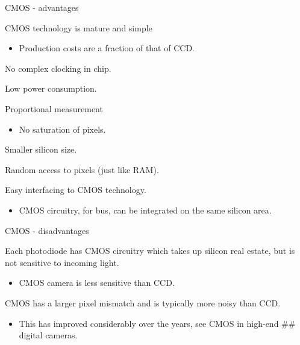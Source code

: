\documentclass[compress]{beamer}
\begin{document}
\begin{frame}{CMOS - advantages}

CMOS technology is mature and simple

\begin{itemize}

\item
  Production costs are a fraction of that of CCD.
\end{itemize}

No complex clocking in chip.

Low power consumption.

Proportional measurement

\begin{itemize}

\item
  No saturation of pixels.
\end{itemize}

Smaller silicon size.

Random access to pixels (just like RAM).

Easy interfacing to CMOS technology.

\begin{itemize}

\item
  CMOS circuitry, \eg for bus, can be integrated on the same silicon
  area.
\end{itemize}

\end{frame}

\begin{frame}{CMOS - disadvantages}

Each photodiode has CMOS circuitry which takes up silicon real estate,
but is not sensitive to incoming light.

\begin{itemize}

\item
  CMOS camera is less sensitive than CCD.
\end{itemize}

CMOS has a larger pixel mismatch and is typically more noisy than CCD.

\begin{itemize}

\item
  This has improved considerably over the years, see CMOS in high-end
  \#\# digital cameras.
\end{itemize}

\end{frame}
\end{document}
